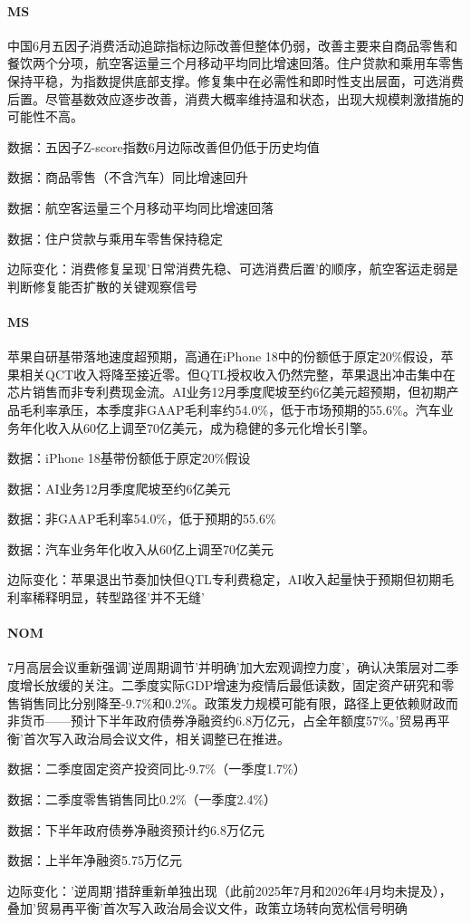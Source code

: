 \documentclass[11pt]{ctexart}
\begin{document}
\paragraph{MS} 中国6月五因子消费活动追踪指标边际改善但整体仍弱，改善主要来自商品零售和餐饮两个分项，航空客运量三个月移动平均同比增速回落。住户贷款和乘用车零售保持平稳，为指数提供底部支撑。修复集中在必需性和即时性支出层面，可选消费后置。尽管基数效应逐步改善，消费大概率维持温和状态，出现大规模刺激措施的可能性不高。
{\small\color{refgray}数据：五因子Z-score指数6月边际改善但仍低于历史均值\par}
{\small\color{refgray}数据：商品零售（不含汽车）同比增速回升\par}
{\small\color{refgray}数据：航空客运量三个月移动平均同比增速回落\par}
{\small\color{refgray}数据：住户贷款与乘用车零售保持稳定\par}
{\small\color{refgray}边际变化：消费修复呈现'日常消费先稳、可选消费后置'的顺序，航空客运走弱是判断修复能否扩散的关键观察信号\par}
\paragraph{MS} 苹果自研基带落地速度超预期，高通在iPhone 18中的份额低于原定20\%假设，苹果相关QCT收入将降至接近零。但QTL授权收入仍然完整，苹果退出冲击集中在芯片销售而非专利费现金流。AI业务12月季度爬坡至约6亿美元超预期，但初期产品毛利率承压，本季度非GAAP毛利率约54.0\%，低于市场预期的55.6\%。汽车业务年化收入从60亿上调至70亿美元，成为稳健的多元化增长引擎。
{\small\color{refgray}数据：iPhone 18基带份额低于原定20\%假设\par}
{\small\color{refgray}数据：AI业务12月季度爬坡至约6亿美元\par}
{\small\color{refgray}数据：非GAAP毛利率54.0\%，低于预期的55.6\%\par}
{\small\color{refgray}数据：汽车业务年化收入从60亿上调至70亿美元\par}
{\small\color{refgray}边际变化：苹果退出节奏加快但QTL专利费稳定，AI收入起量快于预期但初期毛利率稀释明显，转型路径'并不无缝'\par}
\paragraph{NOM} 7月高层会议重新强调'逆周期调节'并明确'加大宏观调控力度'，确认决策层对二季度增长放缓的关注。二季度实际GDP增速为疫情后最低读数，固定资产研究和零售销售同比分别降至-9.7\%和0.2\%。政策发力规模可能有限，路径上更依赖财政而非货币——预计下半年政府债券净融资约6.8万亿元，占全年额度57\%。'贸易再平衡'首次写入政治局会议文件，相关调整已在推进。
{\small\color{refgray}数据：二季度固定资产投资同比-9.7\%（一季度1.7\%）\par}
{\small\color{refgray}数据：二季度零售销售同比0.2\%（一季度2.4\%）\par}
{\small\color{refgray}数据：下半年政府债券净融资预计约6.8万亿元\par}
{\small\color{refgray}数据：上半年净融资5.75万亿元\par}
{\small\color{refgray}边际变化：'逆周期'措辞重新单独出现（此前2025年7月和2026年4月均未提及），叠加'贸易再平衡'首次写入政治局会议文件，政策立场转向宽松信号明确\par}
\end{document}
